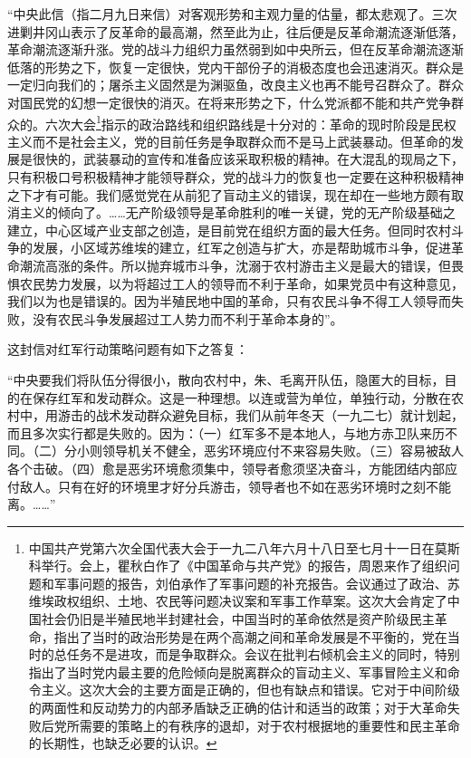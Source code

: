 \documentclass[UTF8, 12pt, a4paper]{ctexrep}
\begin{document}
“中央此信（指二月九日来信）对客观形势和主观力量的估量，都太悲观了。三次进剿井冈山表示了反革命的最高潮，然至此为止，往后便是反革命潮流逐渐低落，革命潮流逐渐升涨。党的战斗力组织力虽然弱到如中央所云，但在反革命潮流逐渐低落的形势之下，恢复一定很快，党内干部份子的消极态度也会迅速消灭。群众是一定归向我们的；屠杀主义固然是为渊驱鱼，改良主义也再不能号召群众了。群众对国民党的幻想一定很快的消灭。在将来形势之下，什么党派都不能和共产党争群众的。六次大会\footnote{中国共产党第六次全国代表大会于一九二八年六月十八日至七月十一日在莫斯科举行。会上，瞿秋白作了《中国革命与共产党》的报告，周恩来作了组织问题和军事问题的报告，刘伯承作了军事问题的补充报告。会议通过了政治、苏维埃政权组织、土地、农民等问题决议案和军事工作草案。这次大会肯定了中国社会仍旧是半殖民地半封建社会，中国当时的革命依然是资产阶级民主革命，指出了当时的政治形势是在两个高潮之间和革命发展是不平衡的，党在当时的总任务不是进攻，而是争取群众。会议在批判右倾机会主义的同时，特别指出了当时党内最主要的危险倾向是脱离群众的盲动主义、军事冒险主义和命令主义。这次大会的主要方面是正确的，但也有缺点和错误。它对于中间阶级的两面性和反动势力的内部矛盾缺乏正确的估计和适当的政策；对于大革命失败后党所需要的策略上的有秩序的退却，对于农村根据地的重要性和民主革命的长期性，也缺乏必要的认识。}指示的政治路线和组织路线是十分对的：革命的现时阶段是民权主义而不是社会主义，党的目前任务是争取群众而不是马上武装暴动。但革命的发展是很快的，武装暴动的宣传和准备应该采取积极的精神。在大混乱的现局之下，只有积极口号积极精神才能领导群众，党的战斗力的恢复也一定要在这种积极精神之下才有可能。我们感觉党在从前犯了盲动主义的错误，现在却在一些地方颇有取消主义的倾向了。……无产阶级领导是革命胜利的唯一关键，党的无产阶级基础之建立，中心区域产业支部之创造，是目前党在组织方面的最大任务。但同时农村斗争的发展，小区域苏维埃的建立，红军之创造与扩大，亦是帮助城市斗争，促进革命潮流高涨的条件。所以抛弃城市斗争，沈溺于农村游击主义是最大的错误，但畏惧农民势力发展，以为将超过工人的领导而不利于革命，如果党员中有这种意见，我们以为也是错误的。因为半殖民地中国的革命，只有农民斗争不得工人领导而失败，没有农民斗争发展超过工人势力而不利于革命本身的”。

这封信对红军行动策略问题有如下之答复：

“中央要我们将队伍分得很小，散向农村中，朱、毛离开队伍，隐匿大的目标，目的在保存红军和发动群众。这是一种理想。以连或营为单位，单独行动，分散在农村中，用游击的战术发动群众避免目标，我们从前年冬天（一九二七）就计划起，而且多次实行都是失败的。因为：（一）红军多不是本地人，与地方赤卫队来历不同。（二）分小则领导机关不健全，恶劣环境应付不来容易失败。（三）容易被敌人各个击破。（四）愈是恶劣环境愈须集中，领导者愈须坚决奋斗，方能团结内部应付敌人。只有在好的环境里才好分兵游击，领导者也不如在恶劣环境时之刻不能离。……”
\end{document}
